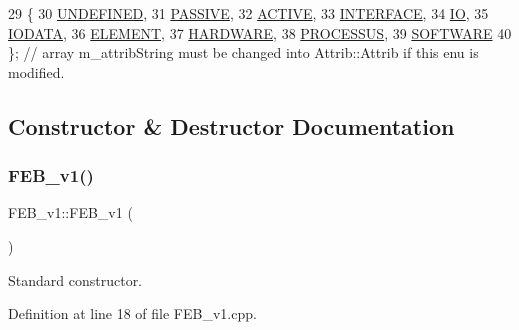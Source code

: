 \begin{DoxyCode}
29                 \{
30     \hyperlink{classAttrib_a69e171d7cc6417835a5a306d3c764235a3a8da2ab97dda18aebab196fe4100531}{UNDEFINED},
31     \hyperlink{classAttrib_a69e171d7cc6417835a5a306d3c764235a2bfb2af57b87031d190a05fe25dd92ed}{PASSIVE},
32     \hyperlink{classAttrib_a69e171d7cc6417835a5a306d3c764235a3b1fec929c0370d1436f2f06e298fb0d}{ACTIVE},
33     \hyperlink{classAttrib_a69e171d7cc6417835a5a306d3c764235aa27c16b480a369ea4d18b07b2516bbc7}{INTERFACE},
34     \hyperlink{classAttrib_a69e171d7cc6417835a5a306d3c764235a1420a5b8c0540b2af210b6975eded7f9}{IO},
35     \hyperlink{classAttrib_a69e171d7cc6417835a5a306d3c764235a0af3b0d0ac323c1704e6c69cf90add28}{IODATA},
36     \hyperlink{classAttrib_a69e171d7cc6417835a5a306d3c764235a7788bc5dd333fd8ce18562b269c9dab1}{ELEMENT},
37     \hyperlink{classAttrib_a69e171d7cc6417835a5a306d3c764235a61ceb22149f365f1780d18f9d1459423}{HARDWARE},
38     \hyperlink{classAttrib_a69e171d7cc6417835a5a306d3c764235a75250e29692496e73effca2c0330977f}{PROCESSUS},
39     \hyperlink{classAttrib_a69e171d7cc6417835a5a306d3c764235a103a67cd0b8f07ef478fa45d4356e27b}{SOFTWARE} 
40   \}; \textcolor{comment}{// array m\_attribString must be changed into Attrib::Attrib if this enu is modified. }
\end{DoxyCode}


\subsection{Constructor \& Destructor Documentation}
\mbox{\label{classFEB__v1_aad65ff3d95f3f60583dad914f9c18a9d}} 
\subsubsection{\texorpdfstring{F\+E\+B\+\_\+v1()}{FEB\_v1()}}
{\footnotesize\ttfamily F\+E\+B\+\_\+v1\+::\+F\+E\+B\+\_\+v1 (\begin{DoxyParamCaption}{ }\end{DoxyParamCaption})}



Standard constructor. 



Definition at line 18 of file F\+E\+B\+\_\+v1.\+cpp.



